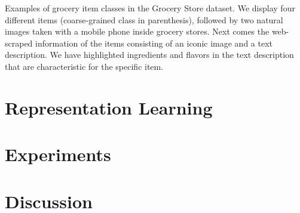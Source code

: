 \begin{table}[t]
	\centering
	\caption{\small{ Examples of grocery item classes in the Grocery Store dataset. We display four different items (coarse-grained class in parenthesis), followed by two natural images taken with a mobile phone inside grocery stores. Next comes the web-scraped information of the items consisting of an iconic image and a text description. We have highlighted ingredients and flavors in the text description that are characteristic for the specific item. }}
	\vspace{-10pt}
	\setlength{\fboxsep}{0pt} 
	\setlength{\fboxrule}{0.33pt}
	
	\label{tab:grocery_store_dataset}
\end{table}


\section{Representation Learning}


\section{Experiments}
\section{Discussion}


\noindent 

%
%
%
%


